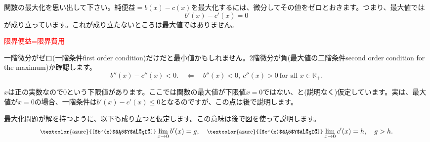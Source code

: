 \begin{frame}{}
関数の最大化を思い出して下さい。純便益$=b(x)-c(x)$を最大化するには、微分してその値をゼロとおきます。つまり、最大値では
\[
b'(x)-c'(x)=0
\]
が成り立っています。これが成り立たないところは最大値ではありません。
	\begin{dinglist}{43}
	\vspace{1.0ex}\setlength{\itemsep}{1.0ex}\setlength{\baselineskip}{12pt}
\pause
	\item	\textcolor{red}{限界便益=限界費用}
\end{dinglist}
\pause
\vspace{2ex}
一階微分がゼロ(一階条件first order condition)だけだと最小値かもしれません。2階微分が負(最大値の二階条件second order condition for the maximum)か確認します。
\[
b''(x)-c''(x)<0. \quad \Leftarrow \quad b''(x)<0, \ c''(x)>0 \ \mbox{for all }x\in\mathbb R_{+}.
\]
\begin{dinglist}{45}
\vspace{1.0ex}\setlength{\itemsep}{1.0ex}\setlength{\baselineskip}{12pt}
\pause
	\item	$x$は正の実数なので0という下限値があります。ここでは関数の最大値が下限値$x=0$ではない、と(説明なく)仮定しています。実は、最大値が$x=0$の場合、一階条件は$b'(x)-c'(x)\leqslant 0$となるのですが、この点は後で説明します。
\pause
	\item	最大化問題が解を持つように、以下も成り立つと仮定します。この意味は後で図を使って説明します。
	\[
	\mbox{\footnotesize \textcolor{azure}{[$b'(x)$の$Y$切片]}} \lim_{x\rightarrow 0}b'(x)=g, \quad \mbox{\footnotesize \textcolor{azure}{[$c'(x)$の$Y$切片]}} \lim_{x\rightarrow 0}c'(x)=h, \quad g>h.
	\]
	\end{dinglist}
\end{frame}

